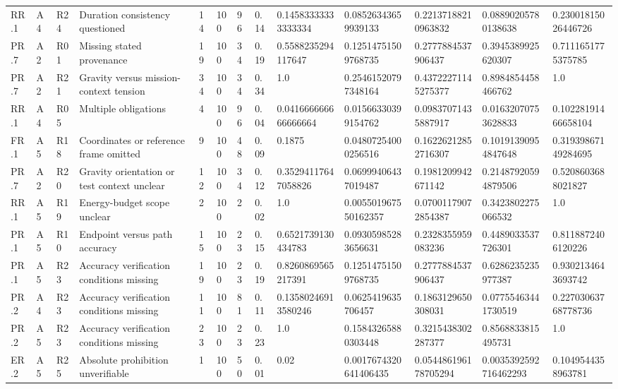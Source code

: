\begin{tabular}{lllllllllllll}
RR.1 & A4 & R24 & Duration consistency questioned & 14 & 100 & 96 & 0.14 & 0.14583333333333334 & 0.08526343659939133 & 0.22137188210963832 & 0.08890205780138638 & 0.23001815026446726 \\
PR.7 & A2 & R01 & Missing stated provenance & 19 & 100 & 34 & 0.19 & 0.5588235294117647 & 0.12514751509768735 & 0.2777884537906437 & 0.3945389925620307 & 0.7111651775375785 \\
PR.7 & A2 & R21 & Gravity versus mission-context tension & 34 & 100 & 34 & 0.34 & 1.0 & 0.25461520797348164 & 0.43722271145275377 & 0.8984854458466762 & 1.0 \\
RR.1 & A4 & R05 & Multiple obligations & 4 & 100 & 96 & 0.04 & 0.041666666666666664 & 0.01566330399154762 & 0.09837071435887917 & 0.01632070753628833 & 0.10228191466658104 \\
FR.1 & A5 & R18 & Coordinates or reference frame omitted & 9 & 100 & 48 & 0.09 & 0.1875 & 0.04807254000256516 & 0.16226212852716307 & 0.10191390954847648 & 0.31939867149284695 \\
PR.7 & A2 & R20 & Gravity orientation or test context unclear & 12 & 100 & 34 & 0.12 & 0.35294117647058826 & 0.06999406437019487 & 0.1981209942671142 & 0.21487920594879506 & 0.5208603688021827 \\
RR.1 & A5 & R19 & Energy-budget scope unclear & 2 & 100 & 2 & 0.02 & 1.0 & 0.005501967550162357 & 0.07001179072854387 & 0.3423802275066532 & 1.0 \\
PR.1 & A5 & R10 & Endpoint versus path accuracy & 15 & 100 & 23 & 0.15 & 0.6521739130434783 & 0.09305985283656631 & 0.2328355959083236 & 0.4489033537726301 & 0.8118872406120226 \\
PR.1 & A5 & R23 & Accuracy verification conditions missing & 19 & 100 & 23 & 0.19 & 0.8260869565217391 & 0.12514751509768735 & 0.2777884537906437 & 0.6286235235977387 & 0.9302134643693742 \\
PR.2 & A4 & R23 & Accuracy verification conditions missing & 11 & 100 & 81 & 0.11 & 0.13580246913580246 & 0.0625419635706457 & 0.1863129650308031 & 0.07755463441730519 & 0.22703063768778736 \\
PR.2 & A5 & R23 & Accuracy verification conditions missing & 23 & 100 & 23 & 0.23 & 1.0 & 0.15843265880303448 & 0.3215438302287377 & 0.8568833815495731 & 1.0 \\
ER.2 & A5 & R25 & Absolute prohibition unverifiable & 1 & 100 & 50 & 0.01 & 0.02 & 0.0017674320641406435 & 0.054486196178705294 & 0.0035392592716462293 & 0.1049544358963781 \\

\end{tabular}
